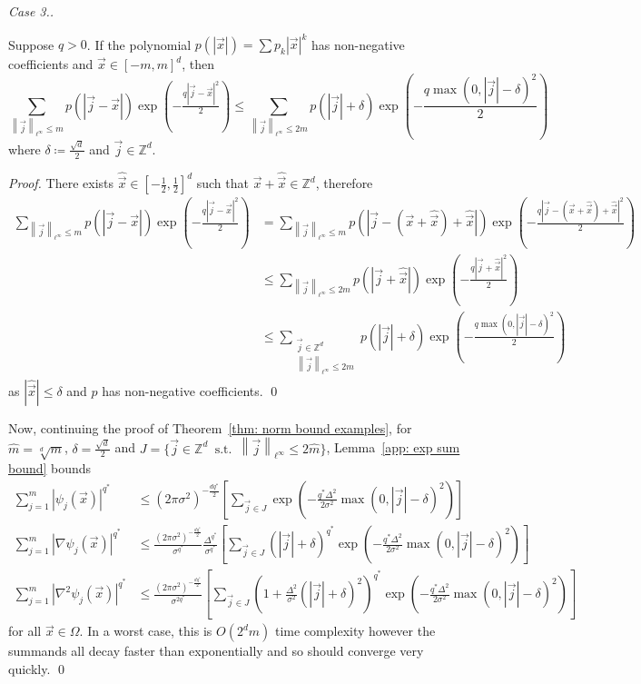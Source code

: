 \documentclass[smallextended]{svjour3}
\let\F\mathds\let\C\mathcal\newcommand{\R}{\F{R}}\newcommand{\A}{\tens{A}}
\newcommand{\norm}[1]{{\left\lVert #1 \right\rVert}}
\newcommand{\1}{\F{1}}
\DeclareMathOperator{\st}{\;s.t.\;}
\renewcommand{\hat}{\widehat}\renewcommand{\tilde}{\widetilde}
\newcommand{\Domain}{\Omega}\newcommand{\domain}{\omega}
\begin{document}
\begin{proof}[Case 3.]
		\begin{lemma}\label{app: exp sum bound}
			Suppose $q>0$. If the polynomial $p(|\vec{x}|) = \sum p_k|\vec{x}|^k$ has non-negative coefficients and $\vec{x}\in[-m,m]^d$, then
			$$\sum_{\norm{\vec{j}}_{\ell^\infty}\leq m} p(|\vec{j}-\vec{x}|)\exp\left(-\tfrac{q|\vec{j}-\vec{x}|^2}{2}\right)\leq \sum_{\norm{\vec{j}}_{\ell^\infty}\leq2m}p(|\vec{j}|+\delta)\exp\left(-\frac{q\max(0,|\vec{j}|-\delta)^2}{2}\right)$$
			where $\delta\coloneqq \frac{\sqrt{d}}{2}$ and $\vec{j}\in\F Z^d$.
		\end{lemma}
		\begin{proof}
			There exists $\hat{\vec{x}}\in[-\tfrac12,\tfrac12]^d$ such that $\vec{x} + \hat{\vec{x}}\in\F Z^d$, therefore
			\begin{align*}
				\sum_{\norm{\vec{j}}_{\ell^\infty}\leq m} p(|\vec{j}-\vec{x}|)\exp\left(-\tfrac{q|\vec{j}-\vec{x}|^2}{2}\right) &= \sum_{\norm{\vec{j}}_{\ell^\infty}\leq m} p(|\vec{j}-(\vec{x}+\hat{\vec{x}})+\hat{\vec{x}}|)\exp\left(-\tfrac{q|\vec{j}-(\vec{x}+\hat{\vec{x}})+\hat{\vec{x}}|^2}{2}\right)
				\\&\leq \sum_{\norm{\vec{j}}_{\ell^\infty}\leq2m} p(|\vec{j}+\hat{\vec{x}}|)\exp\left(-\tfrac{q|\vec{j}+\hat{\vec{x}}|^2}{2}\right)
				\\&\leq \sum_{\substack{\vec{j}\in\F Z^d\\\norm{\vec{j}}_{\ell^\infty}\leq2m}} p(|\vec{j}|+\delta)\exp\left(-\tfrac{q\max(0,|\vec{j}|-\delta)^2}{2}\right)
			\end{align*}
			as $|\hat{\vec{x}}|\leq \delta$ and $p$ has non-negative coefficients. 
			\qed\end{proof}
		
		Now, continuing the proof of Theorem~\ref{thm: norm bound examples}, for $\hat m=\sqrt[d]{m}$, $\delta=\frac{\sqrt{d}}{2}$ and $J=\{\vec{j}\in\F Z^d \st \norm{\vec{j}}_{\ell^\infty}\leq 2\hat m\}$, Lemma~\ref{app: exp sum bound} bounds 
		\begin{align*}
			\sum_{j=1}^m |\psi_j(\vec{x})|^{q^*} &\leq (2\pi\sigma^2)^{-\frac{dq^*}{2}} \left[\sum_{\vec{j}\in J} \exp\left(-\frac{q^*\Delta^2}{2\sigma^2}\max(0,|\vec{j}|-\delta)^2\right)\right]
			\\\sum_{j=1}^m |\nabla\psi_j(\vec{x})|^{q^*} &\leq \frac{(2\pi\sigma^2)^{-\frac{dq^*}{2}}}{\sigma^{q^*}}\frac{\Delta^{q^*}}{\sigma^{q^*}} \left[\sum_{\vec{j}\in J} (|\vec{j}|+\delta)^{q^*}\exp\left(-\frac{q^*\Delta^2}{2\sigma^2}\max(0,|\vec{j}|-\delta)^2\right)\right]
			\\\sum_{j=1}^m |\nabla^2\psi_j(\vec{x})|^{q^*} &\leq \frac{(2\pi\sigma^2)^{-\frac{dq^*}{2}}}{\sigma^{2q^*}} \left[\sum_{\vec{j}\in J} \left(1+\frac{\Delta^2}{\sigma^2}(|\vec{j}|+\delta)^2\right)^{q^*}\exp\left(-\frac{q^*\Delta^2}{2\sigma^2}\max(0,|\vec{j}|-\delta)^2\right)\right]
		\end{align*}
		for all $\vec{x}\in\Domain$. In a worst case, this is $O(2^dm)$ time complexity however the summands all decay faster than exponentially and so should converge very quickly.	
		\qed\end{proof}
	
	
\end{document}
